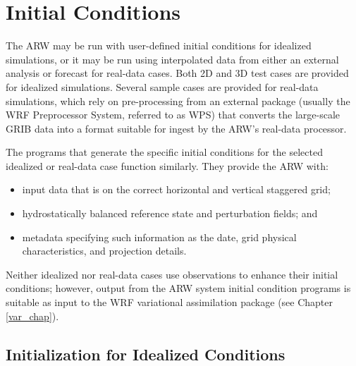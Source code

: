 \chapter{Initial Conditions}
\label{initialization_chap}

The ARW may be run with user-defined initial conditions 
for idealized simulations, or it may be run using
interpolated data from either an external analysis or forecast for
real-data cases.  Both 2D and 3D test cases are provided for idealized
simulations.  
Several sample cases are provided for real-data simulations, which
rely on pre-processing from an external package (usually the 
WRF Preprocessor System, referred to as WPS) that converts
the large-scale GRIB data into a format suitable for ingest by the ARW's
real-data processor.

The programs that generate the specific initial conditions for the selected 
idealized or real-data case function similarly. They provide the ARW with:
\begin{itemize}\setlength{\parskip}{-5pt}
\item input data that is on the correct horizontal and vertical staggered grid;
\item hydrostatically balanced reference state and perturbation fields; and
\item metadata specifying such information as the date, grid physical characteristics,
and projection details.
\end{itemize}
\noindent Neither idealized nor real-data cases use
observations to enhance their initial conditions; however, output from 
the ARW system initial condition programs is suitable as input to the WRF variational
assimilation package (see Chapter \ref{var_chap}).

\section{Initialization for Idealized Conditions}

